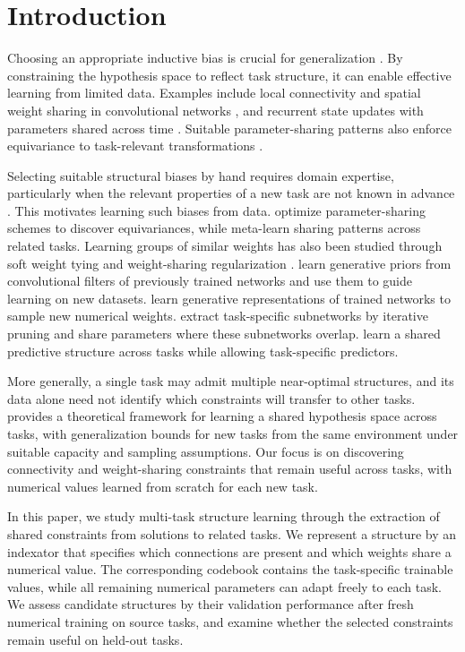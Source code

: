 \section{Introduction}

Choosing an appropriate inductive bias is crucial for generalization \cite{baxter2000model}.
By constraining the hypothesis space to reflect task structure, it can enable effective learning from limited data.
Examples include local connectivity and spatial weight sharing in convolutional networks \cite{lecun1998gradient}, and recurrent state updates with parameters shared across time \cite{elman1990finding}.
Suitable parameter-sharing patterns also enforce equivariance to task-relevant transformations \cite{ravanbakhsh2017equivariance}.

Selecting suitable structural biases by hand requires domain expertise, particularly when the relevant properties of a new task are not known in advance \cite{yeh2022equivariance}.
This motivates learning such biases from data.
\citet{yeh2022equivariance} optimize parameter-sharing schemes to discover equivariances, while \citet{zhou2021meta} meta-learn sharing patterns across related tasks.
Learning groups of similar weights has also been studied through soft weight tying \cite{nowlan1991adaptive} and weight-sharing regularization \cite{shakerinava2024weight}.
\citet{atanov2019deep} learn generative priors from convolutional filters of previously trained networks and use them to guide learning on new datasets.
\citet{schurholt2022hyper} learn generative representations of trained networks to sample new numerical weights.
\citet{sun2020sparse} extract task-specific subnetworks by iterative pruning and share parameters where these subnetworks overlap.
\citet{ando2005framework} learn a shared predictive structure across tasks while allowing task-specific predictors.

More generally, a single task may admit multiple near-optimal structures, and its data alone need not identify which constraints will transfer to other tasks.
\citet{baxter2000model} provides a theoretical framework for learning a shared hypothesis space across tasks, with generalization bounds for new tasks from the same environment under suitable capacity and sampling assumptions.
Our focus is on discovering connectivity and weight-sharing constraints that remain useful across tasks, with numerical values learned from scratch for each new task.

In this paper, we study multi-task structure learning through the extraction of shared constraints from solutions to related tasks.
We represent a structure by an indexator that specifies which connections are present and which weights share a numerical value.
The corresponding codebook contains the task-specific trainable values, while all remaining numerical parameters can adapt freely to each task.
We assess candidate structures by their validation performance after fresh numerical training on source tasks, and examine whether the selected constraints remain useful on held-out tasks.

